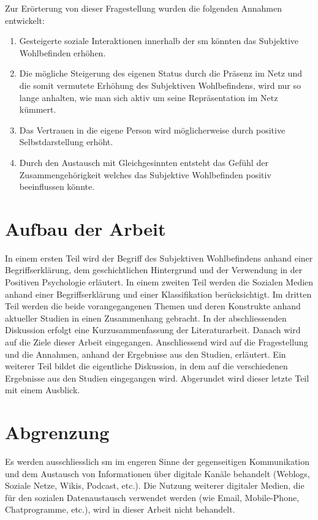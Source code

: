 Zur Erörterung von dieser Fragestellung wurden die folgenden Annahmen entwickelt:

\begin{enumerate}
\item Gesteigerte soziale Interaktionen innerhalb der \gls{sm} könnten das Subjektive Wohlbefinden erhöhen.
\item Die mögliche Steigerung des eigenen Status durch die Präsenz im Netz und die somit vermutete Erhöhung des Subjektiven Wohlbefindens, wird nur so lange anhalten, wie man sich aktiv um seine Repräsentation im Netz kümmert.
\item Das Vertrauen in die eigene Person wird möglicherweise durch positive Selbstdarstellung erhöht.
\item Durch den Austausch mit Gleichgesinnten entsteht das Gefühl der Zusammengehörigkeit welches das Subjektive Wohlbefinden positiv beeinflussen könnte.
\end{enumerate}

\section{Aufbau der Arbeit}\label{sec.aufbau}
In einem ersten Teil wird der Begriff des Subjektiven Wohlbefindens anhand einer Begriffserklärung, dem geschichtlichen Hintergrund und der Verwendung in der Positiven Psychologie erläutert. In einem zweiten Teil werden die Sozialen Medien anhand einer Begriffserklärung und einer Klassifikation berücksichtigt. Im dritten Teil werden die beide vorangegangenen Themen und deren Konstrukte anhand aktueller Studien in einen Zusammenhang gebracht. In der abschliessenden Diskussion erfolgt eine Kurzusammenfassung der Literaturarbeit. Danach wird auf die Ziele dieser Arbeit eingegangen. Anschliessend wird auf die Fragestellung und die Annahmen, anhand der Ergebnisse aus den Studien, erläutert. Ein weiterer Teil bildet die eigentliche Diskussion, in dem auf die verschiedenen Ergebnisse aus den Studien eingegangen wird. Abgerundet wird dieser letzte Teil mit einem Ausblick.

\section{Abgrenzung}\label{sec.abgrenzung}
Es werden ausschliesslich \gls{sm} im engeren Sinne der gegenseitigen Kommunikation und dem Austausch von Informationen über digitale Kanäle behandelt (Weblogs, Soziale Netze, Wikis, Podcast, etc.). 
Die Nutzung weiterer digitaler Medien, die für den sozialen Datenaustausch verwendet werden (wie Email, Mobile-Phone, Chatprogramme, etc.), wird in dieser Arbeit nicht behandelt.

